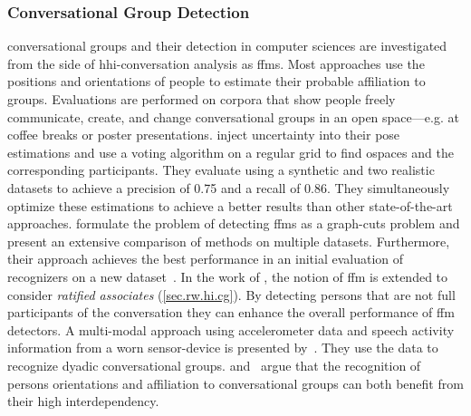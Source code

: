 
\subsubsection{Conversational Group Detection}\label{sec.rw.hi.focused-rw.groups}

\Glspl{conversational group} and their detection in computer sciences are investigated from the side of \gls{hhi}-\gls{conversation} analysis as \glspl{ffm}.
Most approaches use the positions and orientations of  people to estimate their probable affiliation to groups.
Evaluations are performed on corpora that show people freely communicate, create, and change \glspl{conversational group} in an open space---e.g. at coffee breaks or poster presentations.
 inject uncertainty into their pose estimations and use a voting algorithm on a regular grid to find \glspl{ospace} and the corresponding participants.
They evaluate using a synthetic and two realistic datasets to achieve a precision of 0.75 and a recall of 0.86.
They simultaneously optimize these estimations to achieve a better results than other state-of-the-art approaches.
 formulate the problem of detecting \glspl{ffm} as a graph-cuts problem and present an extensive comparison of methods on multiple datasets.
Furthermore, their approach achieves the best performance in an initial evaluation of recognizers on a new dataset~\cite{Alameda-Pineda2016}.
In the work of , the notion of \gls{ffm} is extended to consider \emph{ratified associates} (\cref{sec.rw.hi.cg}).
By detecting persons that are not full participants of the \gls{conversation} they can enhance the overall performance of \gls{ffm} detectors.
A multi-modal approach using accelerometer data and speech activity information from a worn sensor-\gls{device} is presented by~.
They use the data to recognize dyadic \glspl{conversational group}.
 and~ argue that the recognition of persons orientations and affiliation to \glspl{conversational group} can both benefit from their high interdependency.
